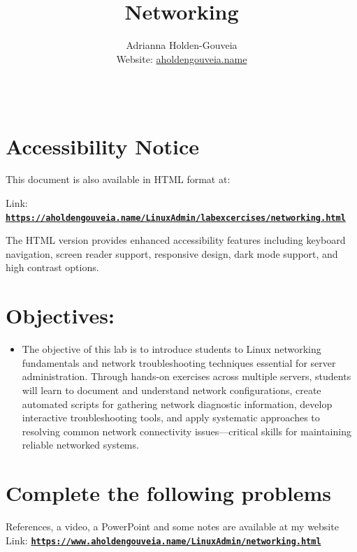 \documentclass[12pt]{article}
\title{Networking}
\author{
        Adrianna Holden-Gouveia \\
        Website: \href{https://aholdengouveia.name}{aholdengouveia.name}\\ 
        \date{\vspace{-5ex}}
        \faGithub {: aholdengouveia} \\
        }
\begin{document}
    

\maketitle



\section*{Accessibility Notice}
This document is also available in HTML format at:

Link: \href{https://aholdengouveia.name/LinuxAdmin/labexcercises/networking.html}{\textbf{\nolinkurl{https://aholdengouveia.name/LinuxAdmin/labexcercises/networking.html}}}

The HTML version provides enhanced accessibility features including keyboard navigation, screen reader support, responsive design, dark mode support, and high contrast options.

\section*{Objectives:}
\begin{itemize}
    \item The objective of this lab is to introduce students to Linux networking fundamentals and network troubleshooting techniques essential for server administration. Through hands-on exercises across multiple servers, students will learn to document and understand network configurations, create automated scripts for gathering network diagnostic information, develop interactive troubleshooting tools, and apply systematic approaches to resolving common network connectivity issues—critical skills for maintaining reliable networked systems.
\end{itemize}
\section*{Complete the following problems}

References, a video, a PowerPoint and some notes are available at my website
Link: \href{https://www.aholdengouveia.name/LinuxAdmin/networking.html}{\textbf{\nolinkurl{https://www.aholdengouveia.name/LinuxAdmin/networking.html}}}
\end{document}
